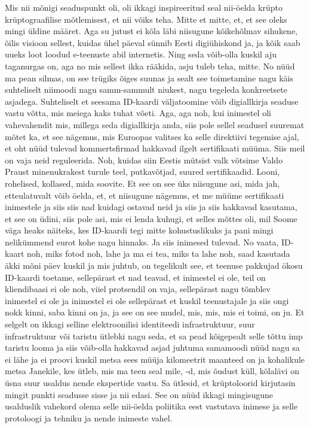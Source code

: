 Mis nii mõnigi seaduspunkt oli, oli ikkagi inspireeritud seal nii-öelda krüpto krüptograafilise mõtlemisest, et nii võiks teha. Mitte et mitte, et, et see oleks mingi üldine määret. Aga su jutust ei kõla läbi niisugune kõikehõlmav sihukene, õilis visioon sellest, kuidas ühel päeval sünnib Eesti digiühiskond ja, ja kõik saab uueks loot loodud e-teenuste abil internetis. Ning seda võib-olla kuskil aju taganurgas on, aga no mis sellest ikka rääkida, asju tuleb teha, mitte. No nüüd ma pean silmas, on see trügiks õiges suunas ja sealt see toimetamine nagu käis suhteliselt niimoodi nagu samm-sammult niukest, nagu tegeleda konkreetsete asjadega. Suhteliselt et seesama ID-kaardi väljatoomine võib digiallkirja seaduse vastu võtta, mis meiega kaks tuhat võeti. Aga, aga noh, kui inimestel oli vahevahendit mis, millega seda digiallkirja anda, siis pole sellel seadusel suuremat mõtet ka, et see nägemus, mis Euroopas valitses ka selle direktiivi tegemise ajal, et oht nüüd tulevad kommertsfirmad hakkavad ilgelt sertifikaati müüma. Siis meil on vaja neid reguleerida. Noh, kuidas siin Eestis mütsist valk võtsime Valdo Praust minenukrakest turule teel, putkavõtjad, suured sertifikaadid. Looni, rohelised, kollased, mida soovite. Et see on see üks niisugune asi, mida jah, etteulatuvalt võib öelda, et, et niisugune nägemus, et me müüme sertifikaati inimestele ja siis siis nad kuidagi ostavad neid ja siis ja siis hakkavad kasutama, et see on üdini, siis pole asi, mis ei lenda kuhugi, et selles mõttes oli, mil Soome väga heaks näiteks, kes ID-kaardi tegi mitte kohustuslikuks ja pani mingi nelikümmend eurot kohe nagu hinnaks. Ja siis inimesed tulevad. No vaata, ID-kaart noh, miks fotod noh, lahe ja ma ei tea, miks ta lahe noh, saad kasutada äkki mõni päev kuskil ja mis juhtub, on tegelikult see, et teenuse pakkujad ökosu ID-kaardi toetame, sellepärast et nad teavad, et inimestel ei ole, teil on kliendibaasi ei ole noh, viiel protsendil on vaja, sellepärast nagu tõmblev inimestel ei ole ja inimestel ei ole sellepärast et kuskil teenustajale ja siis ongi nokk kinni, saba kinni on ja, ja see on see mudel, mis, mis, mis ei toimi, on ju. Et selgelt on ikkagi selline elektroonilisi identiteedi infrastruktuur, suur infrastruktuur või taristu ütlebki nagu seda, et sa pead kõigepealt selle tõttu imp taristu looma ja siis võib-olla hakkavad asjad juhtuma samamoodi nüüd nagu sa ei lähe ja ei proovi kuskil metsa sees müüja kilomeetrit maanteed on ja kohalikule metsa Janekile, kes ütleb, mis ma teen seal mile, -d, mis õudust küll, kõlalävi on üsna suur usaldus nende ekspertide vastu. Sa ütlesid, et krüptoloorid kirjutasin mingit punkti seadusse sisse ja nii edasi. See on nüüd ikkagi mingisugune usalduslik vahekord olema selle nii-öelda poliitika eest vastutava inimese ja selle protoloogi ja tehniku ja nende inimeste vahel.
